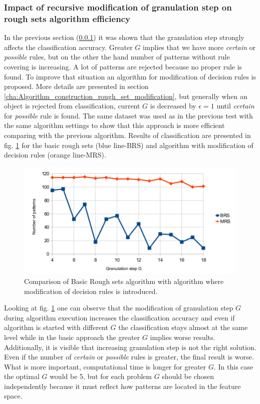 \subsubsection{Impact of recursive modification of granulation step on rough
sets algorithm efficiency}
\label{cha:Simulation_reaearch_2}
In the previous section (\ref{cha:Simulation_reaearch_2}) it was shown that the
granulation step strongly affects the classification accuracy.
Greater $G$ implies that we have more \textit{certain} or \textit{possible}
rules, but on the other the hand number of patterns without rule covering is 
increasing. A lot of patterns are rejected because no proper rule is found. To improve that
situation an algorithm for modification of decision rules is proposed. More
details are presented in section \ref{cha:Algorithm_construction_rough_set_modification}, but generally when an
object is rejected from classification, current $G$ is decreased by $\epsilon=1$ until 
\textit{certain} for \textit{possible} rule is found. The same dataset was used as in
the previous test with the same algorithm settings to show that this approach
is more efficient comparing with the previous algorithm. Results of classification
are presented in fig. \ref{fig:Simulation_research_2} for the basic rough
sets (blue line-BRS) and algorithm with modification of decision rules (orange
line-MRS).
\begin{figure}[H]
    \begin{center}
        \includegraphics[width=\textwidth]{fig/rough_chart.png}
    \end{center}
    \caption{Comparison of Basic Rough sets algorithm with algorithm where
    modification of decision rules is introduced.}
    \label{fig:Simulation_research_2}
\end{figure}

Looking at fig. \ref{fig:Simulation_research_2} one can observe that
the modification of granulation step $G$ during algorithm execution increases 
the classification accuracy and even if algorithm is started with different $G$
the classification stays almost at the same level while in the basic approach the 
greater $G$ implies worse results. Additionally, it is visible that increasing granulation 
step is not the right solution. Even if the number of \textit{certain} or
\textit{possible} rules is greater, the final result is worse. What is more
important, computational time is longer for greater $G$. In this case the optimal 
$G$ would be 5, but for each problem $G$ should be chosen independently because 
it must reflect how patterns are located in the feature space.

